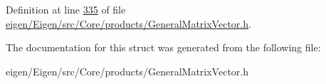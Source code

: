 Definition at line \hyperlink{eigen_2_eigen_2src_2_core_2products_2_general_matrix_vector_8h_source_l00335}{335} of file \hyperlink{eigen_2_eigen_2src_2_core_2products_2_general_matrix_vector_8h_source}{eigen/\+Eigen/src/\+Core/products/\+General\+Matrix\+Vector.\+h}.



The documentation for this struct was generated from the following file\+:\begin{DoxyCompactItemize}
\item 
eigen/\+Eigen/src/\+Core/products/\+General\+Matrix\+Vector.\+h\end{DoxyCompactItemize}
